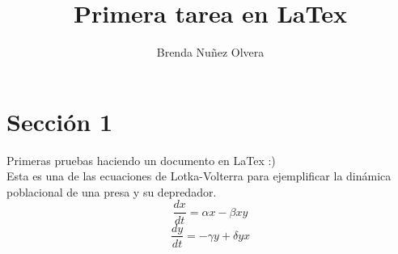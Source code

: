 \documentclass[a4paper,10pt]{article}
\title{Primera tarea en LaTex} %
\author{Brenda Nuñez Olvera} %
\begin{document}
\maketitle

% 

\section{Sección 1}

Primeras pruebas haciendo un documento en LaTex :) \\ %

Esta es una de las ecuaciones de Lotka-Volterra para ejemplificar la dinámica poblacional de una presa y su depredador. \\ %


$$\frac{dx}{dt}= \alpha x - \beta xy$$
$$\frac{dy}{dt}= -\gamma y + \delta yx$$
\end{document}
